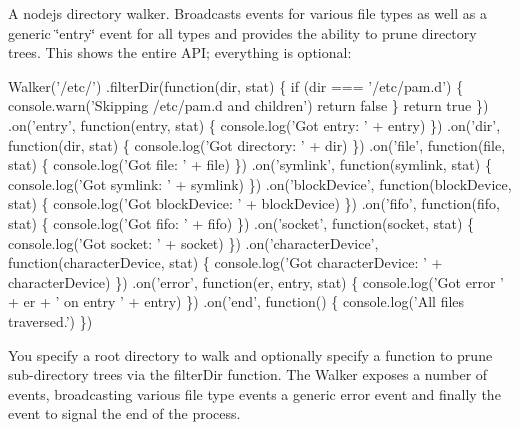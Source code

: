 A nodejs directory walker. Broadcasts events for various file types as well as a generic \char`\"{}entry\char`\"{} event for all types and provides the ability to prune directory trees. This shows the entire A\+PI; everything is optional\+:


\begin{DoxyCode}
Walker('/etc/')
  .filterDir(function(dir, stat) \{
    if (dir === '/etc/pam.d') \{
      console.warn('Skipping /etc/pam.d and children')
      return false
    \}
    return true
  \})
  .on('entry', function(entry, stat) \{
    console.log('Got entry: ' + entry)
  \})
  .on('dir', function(dir, stat) \{
    console.log('Got directory: ' + dir)
  \})
  .on('file', function(file, stat) \{
    console.log('Got file: ' + file)
  \})
  .on('symlink', function(symlink, stat) \{
    console.log('Got symlink: ' + symlink)
  \})
  .on('blockDevice', function(blockDevice, stat) \{
    console.log('Got blockDevice: ' + blockDevice)
  \})
  .on('fifo', function(fifo, stat) \{
    console.log('Got fifo: ' + fifo)
  \})
  .on('socket', function(socket, stat) \{
    console.log('Got socket: ' + socket)
  \})
  .on('characterDevice', function(characterDevice, stat) \{
    console.log('Got characterDevice: ' + characterDevice)
  \})
  .on('error', function(er, entry, stat) \{
    console.log('Got error ' + er + ' on entry ' + entry)
  \})
  .on('end', function() \{
    console.log('All files traversed.')
  \})
\end{DoxyCode}


You specify a root directory to walk and optionally specify a function to prune sub-\/directory trees via the {\ttfamily filter\+Dir} function. The Walker exposes a number of events, broadcasting various file type events a generic error event and finally the event to signal the end of the process. 